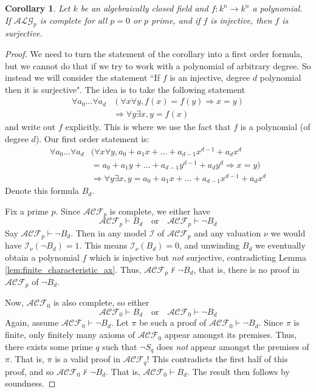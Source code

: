 \documentclass[12pt]{article}
\theoremstyle{plain}
\newtheorem{cor}[thm]{Corollary}
\theoremstyle{definition}
\newcommand{\call}[1]{\mathcal{#1}}
\newcommand{\lto}{\longrightarrow}
\begin{document}
	\begin{cor}
		Let $k$ be an algebraically closed field and $f: k^n \lto k^n$ a polynomial. If $\call{ALG}_p$ is complete for all $p = 0$ or $p$ prime, and if $f$ is injective, then $f$ is surjective.
	\end{cor}
	\begin{proof}
		We need to turn the statement of the corollary into a first order formula, but we cannot do that if we try to work with a polynomial of arbitrary degree. So instead we will consider the statement ``If $f$ is an injective, degree $d$ polynomial then it is surjective". The idea is to take the following statement
		\begin{align}
			\forall a_0\ldots \forall a_{d}&(\forall x \forall y, f(x) = f(y) \Rightarrow x = y)\\
			&\Longrightarrow \forall y \exists x, y = f(x)
		\end{align}
	and write out $f$ explicitly. This is where we use the fact that $f$ is a polynomial (of degree $d$). Our first order statement is:
		\begin{align*}
			\forall a_0\ldots \forall a_{d}&(\forall x \forall y, a_0 + a_1 x + \ldots + a_{d-1}x^{d-1} + a_dx^d\\
			&= a_0 + a_1 y + \ldots + a_{d-1}y^{d-1} + a_dy^d \Rightarrow x = y)\\
			&\Rightarrow \forall y \exists x, y = a_0 + a_1 x + \ldots + a_{d-1}x^{d-1} + a_dx^d
			\end{align*}
		Denote this formula $B_d$.
		
		Fix a prime $p$. Since $\call{ACF}_p$ is complete, we either have
		\begin{equation}
			\call{ACF}_p \vdash B_d\quad \text{or}\quad \call{ACF}_p \vdash \neg B_d
			\end{equation}
		Say $\call{ACF}_p \vdash \neg B_d$. Then in any model $\call{I}$ of $\call{ACF}_p$ and any valuation $\nu$ we would have $\call{I}_\nu(\neg B_d) = 1$. This means $\call{I}_\nu(B_d) = 0$, and unwinding $B_d$ we eventually obtain a polynomial $f$ which is injective but \emph{not} surjective, contradicting Lemma \ref{lem:finite_characteristic_ax}. Thus, $\call{ACF}_p \not\vdash \neg B_d$, that is, there is no proof in $\call{ACF}_p$ of $\neg B_d$.
		
		Now, $\call{ACF}_0$ is also complete, so either
		\begin{equation}
			\call{ACF}_0 \vdash B_d \quad \text{or}\quad \call{ACF}_0 \vdash \neg B_d
			\end{equation}
		Again, assume $\call{ACF}_0 \vdash \neg B_d$. Let $\pi$ be such a proof of $\call{ACF}_0 \vdash \neg B_d$. Since $\pi$ is finite, only finitely many axioms of $\call{ACF}_0$ appear amongst its premises. Thus, there exists some prime $q$ such that $\neg S_q$ does \emph{not} appear amongst the premises of $\pi$. That is, $\pi$ is a valid proof in $\call{ACF}_q$! This contradicts the first half of this proof, and so $\call{ACF}_0 \not\vdash \neg B_d$. That is, $\call{ACF}_0 \vdash B_d$. The result then follows by soundness.
		\end{proof}
	
\end{document}

